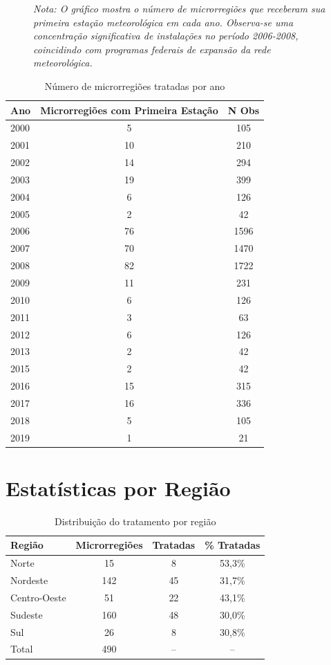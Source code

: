 \documentclass[
	12pt,				%
	oneside,			%
	a4paper,			%
	english,			%
	french,				%
	spanish,			%
	brazil				%
	]{abntex2}
\begin{document}
\begin{apendicesenv}
\begin{figure}[h]
\textit{Nota: O gráfico mostra o número de microrregiões que receberam sua primeira estação meteorológica em cada ano. Observa-se uma concentração significativa de instalações no período 2006-2008, coincidindo com programas federais de expansão da rede meteorológica.}
\end{figure}

\begin{table}[h]
\centering
\caption{Número de microrregiões tratadas por ano}
\label{tab:tratamento_temporal}
\begin{tabular}{lcc}
\toprule
Ano & Microrregiões com Primeira Estação & N Obs \\
\midrule
2000 & 5 & 105 \\
2001 & 10 & 210 \\
2002 & 14 & 294 \\
2003 & 19 & 399 \\
2004 & 6 & 126 \\
2005 & 2 & 42 \\
2006 & 76 & 1596 \\
2007 & 70 & 1470 \\
2008 & 82 & 1722 \\
2009 & 11 & 231 \\
2010 & 6 & 126 \\
2011 & 3 & 63 \\
2012 & 6 & 126 \\
2013 & 2 & 42 \\
2015 & 2 & 42 \\
2016 & 15 & 315 \\
2017 & 16 & 336 \\
2018 & 5 & 105 \\
2019 & 1 & 21 \\
\bottomrule
\end{tabular}
\end{table}

\section{Estatísticas por Região}

\begin{table}[h]
\centering
\caption{Distribuição do tratamento por região}
\label{tab:tratamento_regional}
\begin{tabular}{lccc}
\toprule
Região & Microrregiões & Tratadas & \% Tratadas \\
\midrule
Norte & 15 & 8 & 53,3\% \\
Nordeste & 142 & 45 & 31,7\% \\
Centro-Oeste & 51 & 22 & 43,1\% \\
Sudeste & 160 & 48 & 30,0\% \\
Sul & 26 & 8 & 30,8\% \\
\midrule
Total & 490 & -- & -- \\
\bottomrule
\end{tabular}
\end{table}


\end{apendicesenv}
\end{document}
